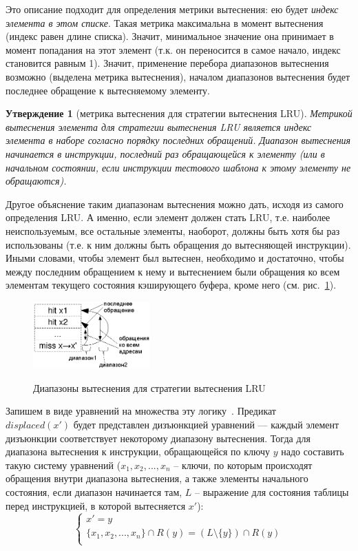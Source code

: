 \documentclass[14pt]{extreport}
\newtheorem{utv}{Утверждение}
\newcommand{\LRU}{\textsf{LRU}\xspace}
\begin{document}
Это описание подходит для определения метрики вытеснения: ею будет
\emph{индекс элемента в этом списке}. Такая метрика максимальна в
момент вытеснения (индекс равен длине списка). Значит, минимальное значение
она принимает в момент попадания на этот элемент (т.к. он
переносится в самое начало, индекс становится равным 1). Значит,
применение перебора диапазонов вытеснения возможно (выделена метрика
вытеснения), началом диапазонов вытеснения будет последнее обращение
к вытесняемому элементу.

\begin{utv}[метрика вытеснения для стратегии вытеснения \LRU]
Метрикой вытеснения элемента для стратегии вытеснения \LRU является
индекс элемента в наборе согласно порядку последних обращений.
Диапазон вытеснения начинается в инструкции, последний раз
обращающейся к элементу (или в начальном состоянии, если инструкции
тестового шаблона к этому элементу не обращаются).
\end{utv}

Другое объяснение таким диапазонам вытеснения можно дать, исходя из
самого определения \LRU. А именно, если элемент должен стать \LRU,
т.е. наиболее неиспользуемым, все остальные элементы, наоборот,
должны быть хотя бы раз использованы (т.е. к ним должны быть
обращения до вытесняющей инструкции). Иными словами, чтобы элемент
был вытеснен, необходимо и достаточно, чтобы между последним
обращением к нему и вытеснением были обращения ко всем элементам
текущего состояния кэширующего буфера, кроме него (см.
рис.~\ref{lru-ranges}).

\begin{figure}[h] \center
  \includegraphics[width=0.4\textwidth]{2.theor/lru}\\
  \caption{Диапазоны вытеснения для стратегии вытеснения \LRU}\label{lru-ranges}
\end{figure}

Запишем в виде уравнений на множества эту логику~\cite{my_syrcose_2009}. Предикат\\
$displaced(x')$ будет представлен дизъюнкцией уравнений --- каждый
элемент дизъюнкции соответствует некоторому диапазону вытеснения.
Тогда для диапазона вытеснения к инструкции, обращающейся по ключу
$y$ надо составить такую систему уравнений ($x_1, x_2, ..., x_n$ --
ключи, по которым происходят обращения внутри диапазона
вытеснения, а также элементы начального состояния, если диапазон начинается там, $L$ --
выражение для состояния таблицы перед инструкцией, в которой вытесняется $x'$):
$$
\left\{
   \begin{array}{l}
    x' = y \\
    \{x_1, x_2, ..., x_n\} \cap R(y) = (L \setminus \{y\}) \cap R(y)\\
   \end{array}
  \right.
$$
\end{document}
